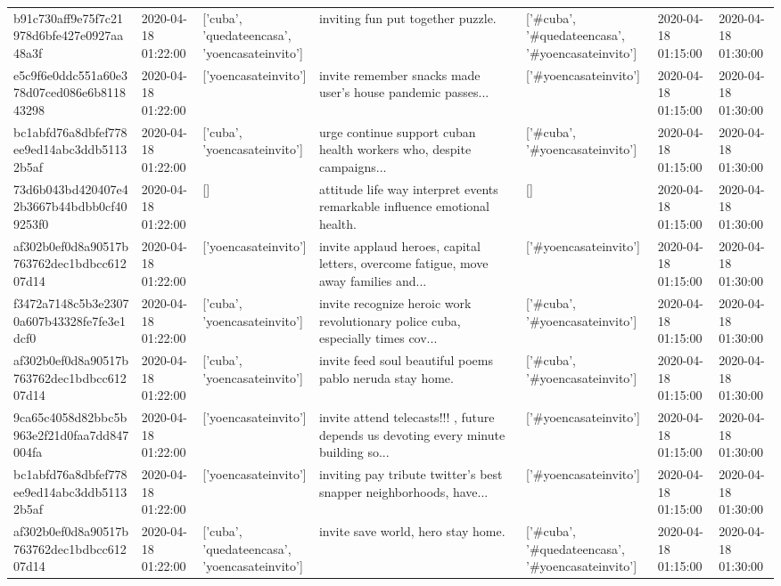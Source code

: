\begin{tabular}{lllllll}
b91c730aff9e75f7c21978d6bfe427e0927aa48a3f & 2020-04-18 01:22:00 & ['cuba', 'quedateencasa', 'yoencasateinvito'] & inviting fun put together puzzle. & ['#cuba', '#quedateencasa', '#yoencasateinvito'] & 2020-04-18 01:15:00 & 2020-04-18 01:30:00 \\
e5c9f6e0ddc551a60e378d07ced086e6b811843298 & 2020-04-18 01:22:00 & ['yoencasateinvito'] & invite remember snacks made user's house pandemic passes... & ['#yoencasateinvito'] & 2020-04-18 01:15:00 & 2020-04-18 01:30:00 \\
bc1abfd76a8dbfef778ee9ed14abc3ddb51132b5af & 2020-04-18 01:22:00 & ['cuba', 'yoencasateinvito'] & urge continue support cuban health workers who, despite campaigns... & ['#cuba', '#yoencasateinvito'] & 2020-04-18 01:15:00 & 2020-04-18 01:30:00 \\
73d6b043bd420407e42b3667b44bdbb0cf409253f0 & 2020-04-18 01:22:00 & [] & attitude life way interpret events remarkable influence emotional health. & [] & 2020-04-18 01:15:00 & 2020-04-18 01:30:00 \\
af302b0ef0d8a90517b763762dec1bdbcc61207d14 & 2020-04-18 01:22:00 & ['yoencasateinvito'] & invite applaud heroes, capital letters, overcome fatigue, move away families and... & ['#yoencasateinvito'] & 2020-04-18 01:15:00 & 2020-04-18 01:30:00 \\
f3472a7148c5b3e23070a607b43328fe7fe3e1dcf0 & 2020-04-18 01:22:00 & ['cuba', 'yoencasateinvito'] & invite recognize heroic work revolutionary police cuba, especially times cov... & ['#cuba', '#yoencasateinvito'] & 2020-04-18 01:15:00 & 2020-04-18 01:30:00 \\
af302b0ef0d8a90517b763762dec1bdbcc61207d14 & 2020-04-18 01:22:00 & ['cuba', 'yoencasateinvito'] & invite feed soul beautiful poems pablo neruda stay home. & ['#cuba', '#yoencasateinvito'] & 2020-04-18 01:15:00 & 2020-04-18 01:30:00 \\
9ca65c4058d82bbc5b963e2f21d0faa7dd847004fa & 2020-04-18 01:22:00 & ['yoencasateinvito'] & invite attend telecasts!!! , future depends us devoting every minute building so... & ['#yoencasateinvito'] & 2020-04-18 01:15:00 & 2020-04-18 01:30:00 \\
bc1abfd76a8dbfef778ee9ed14abc3ddb51132b5af & 2020-04-18 01:22:00 & ['yoencasateinvito'] & inviting pay tribute twitter's best snapper neighborhoods, have... & ['#yoencasateinvito'] & 2020-04-18 01:15:00 & 2020-04-18 01:30:00 \\
af302b0ef0d8a90517b763762dec1bdbcc61207d14 & 2020-04-18 01:22:00 & ['cuba', 'quedateencasa', 'yoencasateinvito'] & invite save world, hero stay home. & ['#cuba', '#quedateencasa', '#yoencasateinvito'] & 2020-04-18 01:15:00 & 2020-04-18 01:30:00 \\

\end{tabular}
